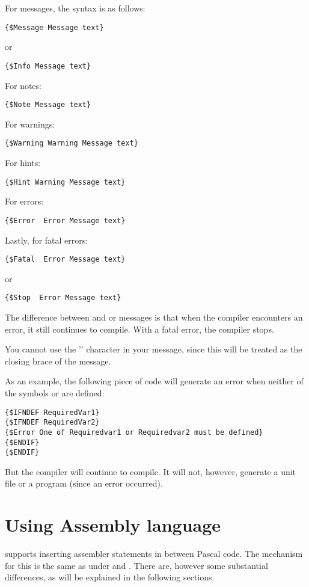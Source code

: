 For messages, the syntax is as follows:
\begin{verbatim}
{$Message Message text}
\end{verbatim}
or
\begin{verbatim}
{$Info Message text}
\end{verbatim}
For notes:
\begin{verbatim}
{$Note Message text}
\end{verbatim}
For warnings:
\begin{verbatim}
{$Warning Warning Message text}
\end{verbatim}
For hints:
\begin{verbatim}
{$Hint Warning Message text}
\end{verbatim}
For errors:
\begin{verbatim}
{$Error  Error Message text}
\end{verbatim}
Lastly, for fatal errors:
\begin{verbatim}
{$Fatal  Error Message text}
\end{verbatim}
or
\begin{verbatim}
{$Stop  Error Message text}
\end{verbatim}
The difference between  and  or 
messages is that when the compiler encounters an error, it still continues
to compile. With a fatal error, the compiler stops.

\begin{remark}You cannot use the '\var{\}}' character in your message, since
this will be treated as the closing brace of the message.
\end{remark}
As an example, the following piece of code will generate an error when
neither of the symbols  or  are defined:
\begin{verbatim}
{$IFNDEF RequiredVar1}
{$IFNDEF RequiredVar2}
{$Error One of Requiredvar1 or Requiredvar2 must be defined}
{$ENDIF}
{$ENDIF}
\end{verbatim}
But the compiler will continue to compile. It will not, however, generate a
unit file or a program (since an error occurred).

\chapter{Using Assembly language}
\label{ch:AsmLang}
\fpc supports inserting assembler statements in between Pascal code. The
mechanism for this is the same as under \tp and \delphi. There are, however
some substantial differences, as will be explained in the following
sections.

